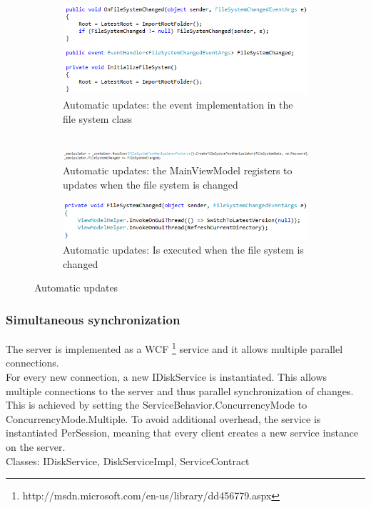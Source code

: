 \documentclass[JCDReport.tex]{subfiles}
\begin{document}
\begin{figure}[h!]
	\begin{subfigure}[b]{1\textwidth}
		\centering
		\includegraphics[scale=1]{Images/file_system_changed1.png} 
		\caption{Automatic updates: the event implementation in the file system class\\\ \\} %
	\end{subfigure}
	
	\begin{subfigure}[b]{1\textwidth}
		\centering
		\includegraphics[scale=1]{Images/file_system_changed2.png} 
		\caption{Automatic updates: the MainViewModel registers to updates when the file system is changed\\}
	\end{subfigure}
	
	\begin{subfigure}[b]{1\textwidth}
		\centering
		\includegraphics[scale=1]{Images/file_system_changed3.png} 
		\caption{Automatic updates: Is executed when the file system is changed\\}
	\end{subfigure}
	\caption{Automatic updates}
\end{figure}


\subsubsection{Simultaneous synchronization}
The server is implemented as a WCF \footnote{http://msdn.microsoft.com/en-us/library/dd456779.aspx} service  and it allows multiple parallel connections.\\
For every new connection, a new IDiskService is instantiated. This allows multiple connections to the server and thus parallel synchronization of changes. This is achieved by setting the ServiceBehavior.ConcurrencyMode to ConcurrencyMode.Multiple. To avoid additional overhead, the service is instantiated PerSession, meaning that every client creates a new service instance on the server.\\
Classes: IDiskService, DiskServiceImpl, ServiceContract
\end{document}
